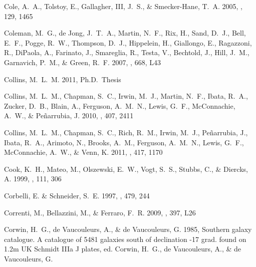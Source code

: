 \documentclass[manuscript]{aastex}
\begin{document}
\begin{thebibliography}{381}
{Cole}, A.~A., {Tolstoy}, E., {Gallagher}, III, J.~S., \& {Smecker-Hane}, T.~A.
  2005, \aj, 129, 1465

{Coleman}, M.~G., {de Jong}, J.~T.~A., {Martin}, N.~F., {Rix}, H., {Sand},
  D.~J., {Bell}, E.~F., {Pogge}, R.~W., {Thompson}, D.~J., {Hippelein}, H.,
  {Giallongo}, E., {Ragazzoni}, R., {DiPaola}, A., {Farinato}, J., {Smareglia},
  R., {Testa}, V., {Bechtold}, J., {Hill}, J.~M., {Garnavich}, P.~M., \&
  {Green}, R.~F. 2007, \apjl, 668, L43

{Collins}, M.~L.~M. 2011, Ph.D.~Thesis

{Collins}, M.~L.~M., {Chapman}, S.~C., {Irwin}, M.~J., {Martin}, N.~F.,
  {Ibata}, R.~A., {Zucker}, D.~B., {Blain}, A., {Ferguson}, A.~M.~N., {Lewis},
  G.~F., {McConnachie}, A.~W., \& {Pe{\~n}arrubia}, J. 2010, \mnras, 407, 2411

{Collins}, M.~L.~M., {Chapman}, S.~C., {Rich}, R.~M., {Irwin}, M.~J.,
  {Pe{\~n}arrubia}, J., {Ibata}, R.~A., {Arimoto}, N., {Brooks}, A.~M.,
  {Ferguson}, A.~M.~N., {Lewis}, G.~F., {McConnachie}, A.~W., \& {Venn}, K.
  2011, \mnras, 417, 1170

{Cook}, K.~H., {Mateo}, M., {Olszewski}, E.~W., {Vogt}, S.~S., {Stubbs}, C., \&
  {Diercks}, A. 1999, \pasp, 111, 306

{Corbelli}, E. \& {Schneider}, S.~E. 1997, \apj, 479, 244

{Correnti}, M., {Bellazzini}, M., \& {Ferraro}, F.~R. 2009, \mnras, 397, L26

{Corwin}, H.~G., {de Vaucouleurs}, A., \& {de Vaucouleurs}, G. 1985, {Southern
  galaxy catalogue. A catalogue of 5481 galaxies south of declination -17 grad.
  found on 1.2m UK Schmidt IIIa J plates}, ed. {Corwin, H.~G., de Vaucouleurs,
  A., \& de Vaucouleurs, G.}


\end{thebibliography}
\end{document}
